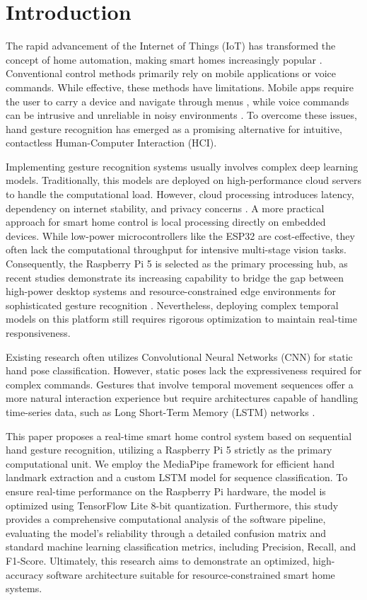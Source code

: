 \section{Introduction}

The rapid advancement of the Internet of Things (IoT) has transformed the concept of home automation, making smart homes increasingly popular \cite{yar2021edge}. Conventional control methods primarily rely on mobile applications or voice commands. While effective, these methods have limitations. Mobile apps require the user to carry a device and navigate through menus \cite{stolojescu2021iot}, while voice commands can be intrusive and unreliable in noisy environments \cite{kurian2023visual}. To overcome these issues, hand gesture recognition has emerged as a promising alternative for intuitive, contactless Human-Computer Interaction (HCI).

Implementing gesture recognition systems usually involves complex deep learning models. Traditionally, this models are deployed on high-performance cloud servers to handle the computational load. However, cloud processing introduces latency, dependency on internet stability, and privacy concerns \cite{wang2020convergence}. A more practical approach for smart home control is local processing directly on embedded devices. While low-power microcontrollers like the ESP32 are cost-effective, they often lack the computational throughput for intensive multi-stage vision tasks. Consequently, the Raspberry Pi 5 is selected as the primary processing hub, as recent studies demonstrate its increasing capability to bridge the gap between high-power desktop systems and resource-constrained edge environments for sophisticated gesture recognition \cite{yu2024realtime}. Nevertheless, deploying complex temporal models on this platform still requires rigorous optimization to maintain real-time responsiveness.

Existing research often utilizes Convolutional Neural Networks (CNN) for static hand pose classification. However, static poses lack the expressiveness required for complex commands. Gestures that involve temporal movement sequences offer a more natural interaction experience but require architectures capable of handling time-series data, such as Long Short-Term Memory (LSTM) networks \cite{sengupta2020review}.

This paper proposes a real-time smart home control system based on sequential hand gesture recognition, utilizing a Raspberry Pi 5 strictly as the primary computational unit. We employ the MediaPipe framework for efficient hand landmark extraction and a custom LSTM model for sequence classification. To ensure real-time performance on the Raspberry Pi hardware, the model is optimized using TensorFlow Lite 8-bit quantization. Furthermore, this study provides a comprehensive computational analysis of the software pipeline, evaluating the model's reliability through a detailed confusion matrix and standard machine learning classification metrics, including Precision, Recall, and F1-Score. Ultimately, this research aims to demonstrate an optimized, high-accuracy software architecture suitable for resource-constrained smart home systems.